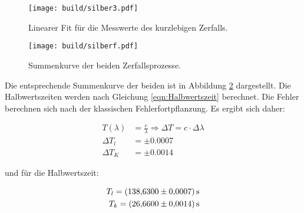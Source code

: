  \begin{figure}
   \centering
   \texttt{[image: build/silber3.pdf]}
   \caption{Linearer Fit für die Messwerte des kurzlebigen Zerfalls.}
   \label{fig:silbertres}
 \end{figure}

 \begin{figure}
   \centering
   \texttt{[image: build/silberf.pdf]}
   \caption{Summenkurve der beiden Zerfallsprozesse.}
   \label{fig:silberf}
 \end{figure}

Die entsprechende Summenkurve der beiden ist in Abbildung \ref{fig:silberf} dargestellt.
Die Halbwertszeiten werden nach Gleichung \eqref{eqn:Halbwertszeit} berechnet.
Die Fehler berechnen sich nach der klassischen Fehlerfortpflanzung.
Es ergibt sich daher:

\begin{align*}
  T(\lambda) &= \frac{c}{\lambda} \Rightarrow \Delta T = c \cdot \Delta \lambda \\
  \Delta T_l &= \pm 0.0007 \\
  \Delta T_K &= \pm 0.0014
\end{align*}

und für die Halbwertszeit:

\begin{align*}
  T_l = \SI{138.63 \pm 0.0007}{\second} \\
  T_k = \SI{26.66 \pm 0.0014}{\second}
\end{align*}

